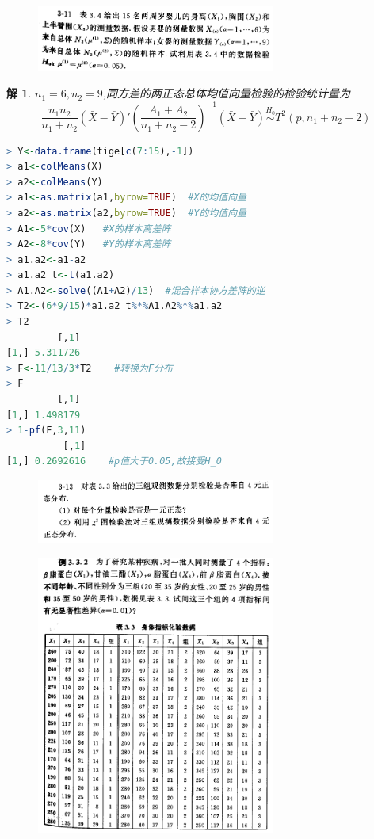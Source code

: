 \documentclass[11pt,a4paper]{ctexart}
\newtheorem*{solution}{解}
\begin{document}
\begin{figure}[H]
	\includegraphics[width=0.7\textwidth]{5.png}
\end{figure}
\begin{solution}
$ n_1=6, n_2=9$,同方差的两正态总体均值向量检验的检验统计量为
$$\frac{n_1n_2}{n_1+n_2}(\bar{X}-\bar{Y})'(\frac{A_1+A_2}{n_1+n_2-2})^{-1}(\bar{X}-\bar{Y})\stackrel{H_0}{\sim}T^2(p,n_1+n_2-2) $$
\end{solution}
\begin{lstlisting}[language=r]
> Y<-data.frame(tige[c(7:15),-1])
> a1<-colMeans(X)  
> a2<-colMeans(Y)
> a1<-as.matrix(a1,byrow=TRUE)  #X的均值向量
> a2<-as.matrix(a2,byrow=TRUE)  #Y的均值向量
> A1<-5*cov(X)   #X的样本离差阵
> A2<-8*cov(Y)   #Y的样本离差阵
> a1.a2<-a1-a2
> a1.a2_t<-t(a1.a2)
> A1.A2<-solve((A1+A2)/13)  #混合样本协方差阵的逆
> T2<-(6*9/15)*a1.a2_t%*%A1.A2%*%a1.a2
> T2
         [,1]
[1,] 5.311726
> F<-11/13/3*T2    #转换为F分布
> F
         [,1]
[1,] 1.498179
> 1-pf(F,3,11)
          [,1]
[1,] 0.2692616    #p值大于0.05,故接受H_0
\end{lstlisting}
\newpage
\begin{figure}[H]
	\includegraphics[width=0.7\textwidth]{6.png}
\end{figure}
\begin{tcolorbox}[colback=black!4!white,colframe=black!40]
\begin{figure}[H]
	\centering
	\includegraphics[width=0.7\textwidth]{7.png}
\end{figure}
\end{tcolorbox}
\end{document}
